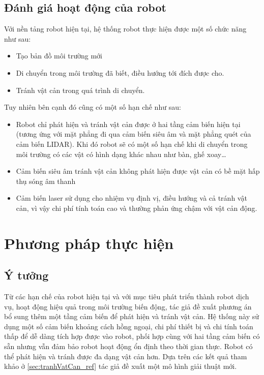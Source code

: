 \subsection{Đánh giá hoạt động của robot}

Với nền tảng robot hiện tại, hệ thống robot thực hiện được một số chức năng như sau:

\begin{itemize}
    \item Tạo bản đồ môi trường mới
    \item Di chuyển trong môi trường đã biết, điều hướng tới đích được cho.
    \item Tránh vật cản trong quá trình di chuyển.
\end{itemize}

Tuy nhiên bên cạnh đó cũng có một số hạn chế như sau:

\begin{itemize}
    \item Robot chỉ phát hiện và tránh vật cản được ở hai tầng cảm biến hiện tại (tương ứng với mặt phẳng đi qua cảm biến siêu âm và mặt phẳng quét của cảm biến LIDAR). Khi đó robot sẽ có một số hạn chế khi di chuyển trong môi trường có các vật có hình dạng khác nhau như bàn, ghế xoay\dots
    \item Cảm biến siêu âm tránh vật cản không phát hiện được vật cản có bề mặt hấp thụ sóng âm thanh
    \item Cảm biến laser sử dụng cho nhiệm vụ định vị, điều hướng và cả tránh vật cản, vì vậy chi phí tính toán cao và thường phản ứng chậm với vật cản động.
\end{itemize}


\section{Phương pháp thực hiện}


\subsection{Ý tưởng}

Từ các hạn chế của robot hiện tại và với mục tiêu phát triển thành robot dịch vụ, hoạt động hiệu quả trong môi trường biến động, tác giả đề xuất phương án bổ sung thêm một tầng cảm biến để phát hiện và tránh vật cản. Hệ thống này sử dụng một số cảm biến khoảng cách hồng ngoại, chi phí thiết bị và chi tính toán thấp để dễ dàng tích hợp được vào robot, phối hợp cùng với hai tầng cảm biến có sẵn nhưng vẫn đảm bảo robot hoạt động ổn định theo thời gian thực. Robot có thể phát hiện và tránh được đa dạng vật cản hơn. Dựa trên các kết quả tham khảo ở \ref{sec:tranhVatCan_ref} tác giả đề xuất một mô hình giải thuật mới.

